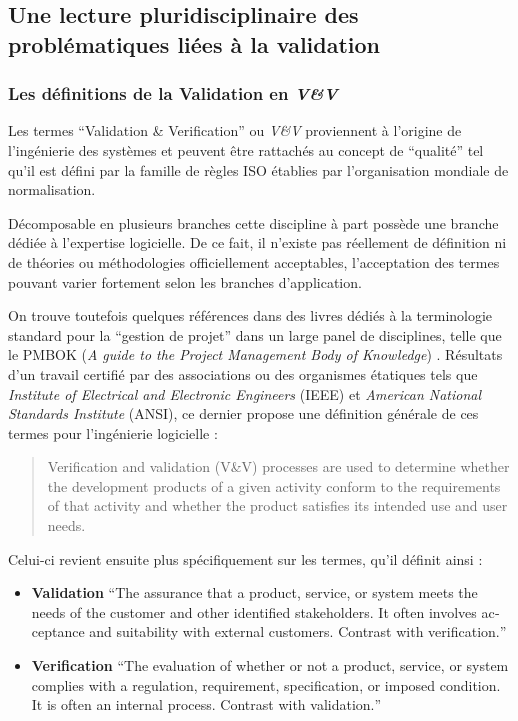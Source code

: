 

\subsection{Une lecture pluridisciplinaire des problématiques liées à la validation}
\label{ssec:triple_lecture}

\subsubsection{Les définitions de la Validation en \textit{V\&V}}
\label{sssec:def_generique_validation}

Les termes \foreignquote{english}{Validation \& Verification} ou \textit{V\&V} proviennent à l'origine de l'ingénierie des systèmes et peuvent être rattachés au concept de \enquote{qualité} tel qu'il est défini par la famille de règles ISO établies par l'organisation mondiale de normalisation.

Décomposable en plusieurs branches cette discipline à part possède une branche dédiée à l'expertise logicielle. De ce fait, il n'existe pas réellement de définition ni de théories ou méthodologies officiellement acceptables, l'acceptation des termes pouvant varier fortement selon les branches d'application.

On trouve toutefois quelques références dans des livres dédiés à la terminologie standard pour la \enquote{gestion de projet} dans un large panel de disciplines, telle que le PMBOK (\textit{A guide to the Project Management Body of Knowledge}) \autocite{PMBOK2013}. Résultats d'un travail certifié par des associations ou des organismes étatiques tels que \textit{Institute of Electrical and Electronic Engineers} (IEEE) et \textit{American National Standards Institute} (ANSI), ce dernier propose une définition générale de ces termes pour l'ingénierie logicielle :

\foreignblockquote{english}[\cite{PMBOK2013}]{Verification and validation (V\&V) processes are used to determine whether the development products of a given activity conform to the requirements of that activity and whether the product satisfies its intended use and user needs.}

Celui-ci revient ensuite plus spécifiquement sur les termes, qu'il définit ainsi :

\begin{itemize}
\item \textbf{Validation} \foreignquote{english}{The assurance that a product, service, or system meets the needs of the customer and other identified stakeholders. It often involves acceptance and suitability with external customers. Contrast with verification.}
\item \textbf{Verification} \foreignquote{english}{The evaluation of whether or not a product, service, or system complies with a regulation, requirement, specification, or imposed condition. It is often an internal process. Contrast with validation.}
\end{itemize}

